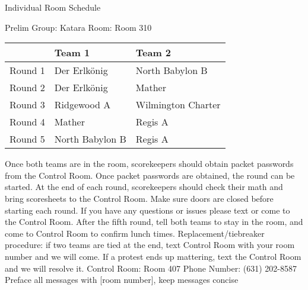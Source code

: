 \documentclass{article}%
\begin{document}
\newpage%
\begin{center}%
\begin{Huge}%
Individual Room Schedule%
\end{Huge}%
\vspace*{16pt}%
\linebreak%
\begin{Large}%
Prelim Group: Katara \hfill Room: Room 310%
\end{Large}%
\end{center}%
%
\begin{tabularx}{\textwidth}{|c|Y|Y|}%
\hline%
&Team 1&Team 2\\%
\hline%
Round 1&Der Erlkönig&North Babylon B\\%
Round 2&Der Erlkönig&Mather\\%
Round 3&Ridgewood A&Wilmington Charter\\%
Round 4&Mather&Regis A\\%
Round 5&North Babylon B&Regis A\\%
\hline%
\end{tabularx}%
\vspace*{16pt}%
\linebreak%
Once both teams are in the room, scorekeepers should obtain packet passwords from the Control Room. Once packet passwords are obtained, the round can be started. At the end of each round, scorekeepers should check their math and bring scoresheets to the Control Room.\newline%
\newline%
Make sure doors are closed before starting each round. If you have any questions or issues please text or come to the Control Room.\newline%
\newline%
After the fifth round, tell both teams to stay in the room, and come to Control Room to confirm lunch times.\newline%
\newline%
Replacement/tiebreaker procedure: if two teams are tied at the end, text Control Room with your room number and we will come. If a protest ends up mattering, text the Control Room and we will resolve it.\newline%
\newline%
Control Room: Room 407\newline%
Phone Number: (631) 202{-}8587\newline%
Preface all messages with {[}room number{]}, keep messages concise%
\vspace*{30pt}%
\end{document}
